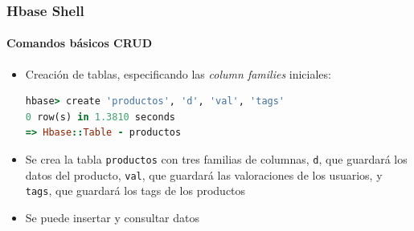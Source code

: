 \documentclass[14pt]{beamer}
\begin{document}
\begin{frame}
  \frametitle{Hbase Shell}
\framesubtitle{Comandos básicos CRUD}
\begin{itemize}



\item Creación de tablas, especificando las {\em column families}
  iniciales:
\begin{lstlisting}[language=ruby]
hbase> create 'productos', 'd', 'val', 'tags'
0 row(s) in 1.3810 seconds
=> Hbase::Table - productos
\end{lstlisting}

\item Se crea la tabla {\tt productos} con tres familias de columnas,
  {\tt d}, que guardará los datos del producto, {\tt val}, que
  guardará las valoraciones de los usuarios, y {\tt tags}, que guardará los
  tags de los productos

\item Se puede insertar y consultar datos
\end{itemize}
\end{frame}


\end{document}
